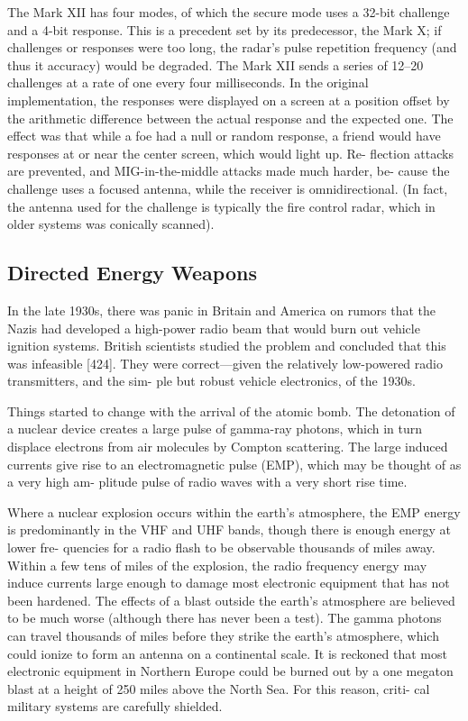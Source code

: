 \documentclass[10pt,journal,compsoc]{IEEEtran}
\begin{document}
The Mark XII has four modes, of which the secure mode uses a 32-bit challenge and
a 4-bit response. This is a precedent set by its predecessor, the Mark X; if challenges or
responses were too long, the radar’s pulse repetition frequency (and thus it accuracy)
would be degraded. The Mark XII sends a series of 12–20 challenges at a rate of one
every four milliseconds. In the original implementation, the responses were displayed
on a screen at a position offset by the arithmetic difference between the actual response
and the expected one. The effect was that while a foe had a null or random response, a
friend would have responses at or near the center screen, which would light up. Re-
flection attacks are prevented, and MIG-in-the-middle attacks made much harder, be-
cause the challenge uses a focused antenna, while the receiver is omnidirectional. (In
fact, the antenna used for the challenge is typically the fire control radar, which in
older systems was conically scanned).

\subsection{Directed Energy Weapons}

In the late 1930s, there was panic in Britain and America on rumors that the Nazis had
developed a high-power radio beam that would burn out vehicle ignition systems.
British scientists studied the problem and concluded that this was infeasible [424].
They were correct—given the relatively low-powered radio transmitters, and the sim-
ple but robust vehicle electronics, of the 1930s.

Things started to change with the arrival of the atomic bomb. The detonation of a
nuclear device creates a large pulse of gamma-ray photons, which in turn displace
electrons from air molecules by Compton scattering. The large induced currents give
rise to an electromagnetic pulse (EMP), which may be thought of as a very high am-
plitude pulse of radio waves with a very short rise time.

Where a nuclear explosion occurs within the earth’s atmosphere, the EMP energy is
predominantly in the VHF and UHF bands, though there is enough energy at lower fre-
quencies for a radio flash to be observable thousands of miles away. Within a few tens
of miles of the explosion, the radio frequency energy may induce currents large enough
to damage most electronic equipment that has not been hardened. The effects of a blast
outside the earth’s atmosphere are believed to be much worse (although there has never
been a test). The gamma photons can travel thousands of miles before they strike the
earth’s atmosphere, which could ionize to form an antenna on a continental scale. It is
reckoned that most electronic equipment in Northern Europe could be burned out by a one megaton
blast at a height of 250 miles above the North Sea. For this reason, criti-
cal military systems are carefully shielded.
\end{document}
